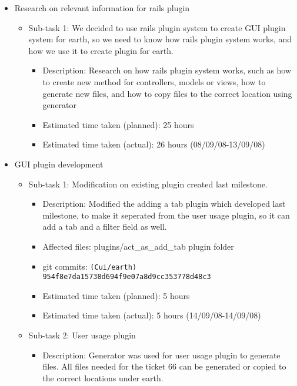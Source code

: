 \begin{itemize}
    \item Research on relevant information for rails plugin
        \begin{itemize}
            \item Sub-task 1: We decided to use rails plugin system to create GUI plugin system for earth, so we need to know how rails plugin system works, and how we use it to create plugin for earth.
                \begin{itemize}
                    \item Description: Research on how rails plugin system works, such as how to create new method for controllers, models or views, how to generate new files, and how to copy files to the correct location using generator
                    \item Estimated time taken (planned): 25 hours
                    \item Estimated time taken (actual):  26 hours (08/09/08-13/09/08)
                \end{itemize}
        \end{itemize}
    \item GUI plugin development
        \begin{itemize}
            \item Sub-task 1: Modification on existing plugin created last milestone.
                \begin{itemize}
                    \item Description: Modified the adding a tab plugin which developed last milestone, to make it seperated from the user usage plugin, so it can add a tab and a filter field as well.
                    \item Affected files: plugins/act\_as\_add\_tab plugin folder
                    \item git commits: \texttt{(Cui/earth) 954f8e7da15738d694f9e07a8d9cc353778d48c3}
                    \item Estimated time taken (planned): 5 hours
                    \item Estimated time taken (actual): 5 hours (14/09/08-14/09/08)
                \end{itemize}
            \item Sub-task 2: User usage plugin
                \begin{itemize}
                    \item Description: Generator was used for user usage plugin to generate files. All files needed for the ticket 66 can be generated or copied to the correct locations under earth.

\end{itemize}
\end{itemize}
\end{itemize}
